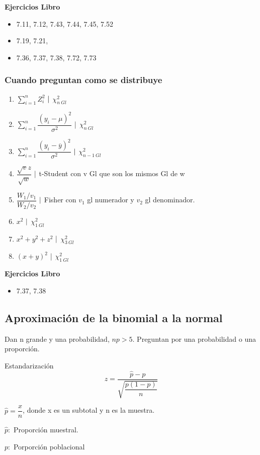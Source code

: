 \textbf{Ejercicios Libro}
\begin{itemize}
	\item 7.11, 7.12, 7.43, 7.44, 7.45, 7.52
	\item 7.19, 7.21,  
	\item 7.36, 7.37, 7.38, 7.72, 7.73
\end{itemize}

\subsubsection{Cuando preguntan como se distribuye}
\begin{enumerate}
	\item $\sum_{i=1}^{n}Z_i^2$ $\arrowvert$ $\chi_{n \  Gl}^2$
	\item $\sum_{i=1}^{n} \dfrac{(y_i-\mu)^2}{\sigma^2}$ $\arrowvert$ $\chi_{n \  Gl}^2$
	\item $\sum_{i=1}^{n}\dfrac{(y_i-\overline{y})^2}{\sigma^2}$ $\arrowvert$ $\chi_{n-1 \  Gl}^2$
	\item $\dfrac{\sqrt{v}z}{\sqrt{w}}$ $\arrowvert$ t-Student con v Gl que son los mismos Gl de w
	\item $\dfrac{W_1/v_1}{W_2/v_2}$ $\arrowvert$ Fisher con $v_1$ gl numerador y $v_2$ gl denominador.
	\item $x^2$ $\arrowvert$ $\chi_{1 \  Gl}^2$
	\item $x^2+y^2+z^2$ $\arrowvert$ $\chi_{3 \  Gl}^2$
	\item $(x+y)^2$ $\arrowvert$ $\chi_{1 \  Gl}^2$
\end{enumerate}

\textbf{Ejercicios Libro}
\begin{itemize}
	\item 7.37, 7.38
\end{itemize}

\subsection{Aproximación de la binomial a la normal}
Dan n grande y una probabilidad, $np>5$. Preguntan por una probabilidad o una proporción.

Estandarización
$$z=\dfrac{\hat{p}-p}{\sqrt{\dfrac{p(1-p)}{n}}}$$

$\hat{p}=\dfrac{x}{n}$, donde x es un subtotal y n es la muestra.

$\hat{p}:$ Proporción muestral.

$p:$ Porporción poblacional

